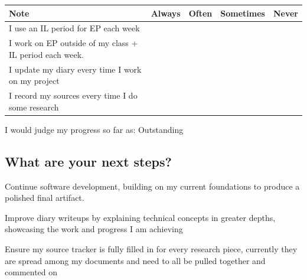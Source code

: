 
\begin{tabularx}{\textwidth}{L C C C C}
\toprule
\textbf{Note} & \textbf{Always} & \textbf{Often} & \textbf{Sometimes} & \textbf{Never} \\
\midrule
I use an IL period for EP each week &  &  &  &  \\
I work on EP outside of my class + IL period each week. &  &  &  &  \\
I update my diary every time I work on my project &  &  &  &  \\
I record my sources every time I do some research &  &  &  &  \\
\bottomrule
\end{tabularx}

I would judge my progress so far as: Outstanding

\subsection*{What are your next steps?}
Continue software development, building on my current foundations to produce a polished final artifact.

Improve diary writeups by explaining technical concepts in greater depths, showcasing the work and progress I am achieving

Ensure my source tracker is fully filled in for every research piece, currently they are spread among my documents and need to all be pulled together and commented on

